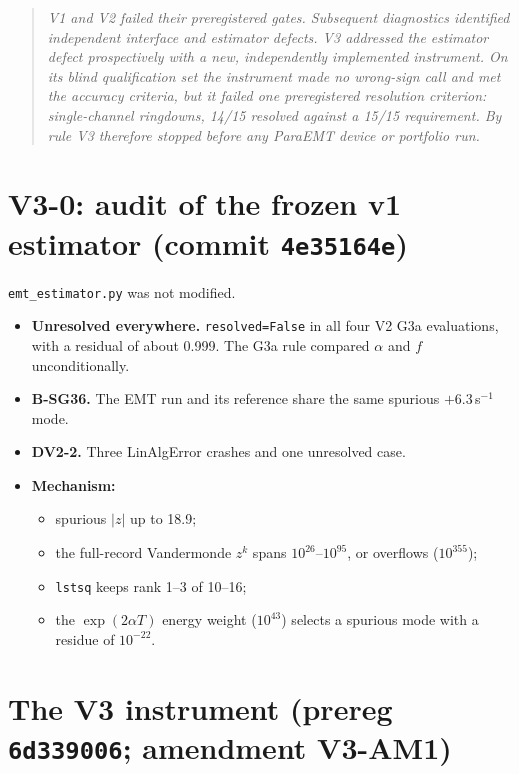 \documentclass[10pt,a4paper]{article}
\newcommand{\sinv}{\,s$^{-1}$}
\newcommand{\f}[1]{\nolinkurl{#1}}
\begin{document}
\begin{quote}\itshape
V1 and V2 failed their preregistered gates. Subsequent diagnostics identified
independent interface and estimator defects. V3 addressed the estimator defect
prospectively with a new, independently implemented instrument. On its blind
qualification set the instrument made no wrong-sign call and met the accuracy
criteria, but it failed one preregistered resolution criterion: single-channel
ringdowns, 14/15 resolved against a 15/15 requirement. By rule V3 therefore
stopped before any ParaEMT device or portfolio run.
\end{quote}

\section{V3-0: audit of the frozen v1 estimator (commit \texttt{4e35164e})}

\f{emt_estimator.py} was not modified.
\begin{itemize}
\item \textbf{Unresolved everywhere.} \texttt{resolved=False} in all four V2
  G3a evaluations, with a residual of about 0.999. The G3a rule compared
  $\alpha$ and $f$ unconditionally.
\item \textbf{B-SG36.} The EMT run and its reference share the same spurious
  $+6.3$\sinv{} mode.
\item \textbf{DV2-2.} Three LinAlgError crashes and one unresolved case.
\item \textbf{Mechanism:}
  \begin{itemize}
  \item spurious $|z|$ up to 18.9;
  \item the full-record Vandermonde $z^k$ spans $10^{26}$--$10^{95}$, or
    overflows ($10^{355}$);
  \item \texttt{lstsq} keeps rank 1--3 of 10--16;
  \item the $\exp(2\alpha T)$ energy weight ($10^{43}$) selects a spurious
    mode with a residue of $10^{-22}$.
  \end{itemize}
\end{itemize}

\section{The V3 instrument (prereg \texttt{6d339006}; amendment V3-AM1)}
\end{document}
